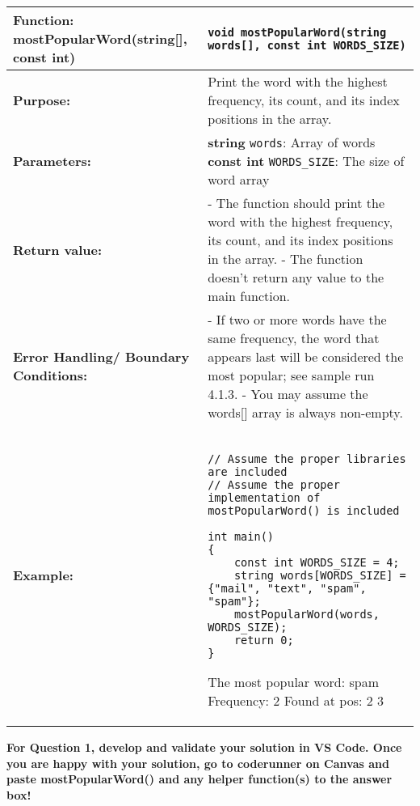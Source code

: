 \newpage
\begin{longtable}[H]{|p{1.7in}|p{4.0in}|} \hline
        \textbf{Function:} mostPopularWord(string[], const int) & \texttt{void mostPopularWord(string words[], const int WORDS_SIZE)}
        \\ \hline
        \textbf{Purpose:}  & Print the word with the highest frequency, its count, and its index positions in the array.\\ \hline
        \textbf{Parameters:} &  
        \textbf{string} \texttt{words}: Array of words \newline
        \textbf{const int} \texttt{WORDS\_SIZE}: The size of word array
\\ \hline
        \textbf{Return value:} & - The function should print the word with the highest frequency, its count, and its index positions in the array. \newline
        - The function doesn't return any value to the main function. \\ \hline
\textbf{Error Handling/ Boundary Conditions:} &  - If two or more words have the same frequency, the word that appears last will be considered the most popular; see sample run 4.1.3. 
\newline
- You may assume the words[] array is always non-empty. 
\\ \hline
        \textbf{Example:} & 
        \begin{example}
        \begin{verbatim}

// Assume the proper libraries are included
// Assume the proper implementation of mostPopularWord() is included

int main()
{
    const int WORDS_SIZE = 4;
    string words[WORDS_SIZE] = {"mail", "text", "spam", "spam"};
    mostPopularWord(words, WORDS_SIZE);
    return 0;
}
        \end{verbatim}
        \end{example}

        \begin{sample}
The most popular word: spam \newline
Frequency: 2 \newline
Found at pos: 2 3 \newline
        \end{sample}
             \\ \hline
\end{longtable}

\textbf{For Question 1, develop and validate your solution in VS Code. Once you are happy with your solution, go to coderunner on Canvas and paste mostPopularWord() and any helper function(s) to the answer box!} 

